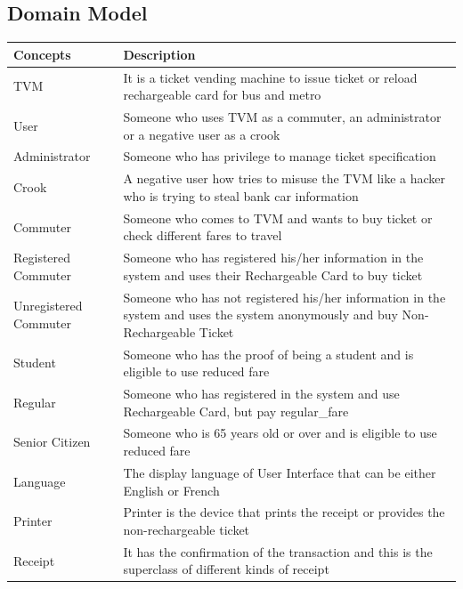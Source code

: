 \documentclass[a4paper,12pt]{report}
\begin{document}
\subsection{Domain Model}
\setlength{\tabcolsep}{18pt}
\renewcommand{\arraystretch}{1.5}
\begin{tabular}[H]{ |p{3cm}|p{12cm}| }
	\hline
	\textbf{Concepts}  & \textbf{Description}  \\
	\hline
	TVM & It is a ticket vending machine to issue ticket or reload rechargeable card for bus and metro
	\\
	\hline
	User & Someone who uses TVM as a commuter, an administrator or a negative user as a crook
	\\
	\hline
	Administrator & Someone who has privilege to manage ticket specification
	\\
	\hline
	Crook & A negative user how tries to misuse the TVM like a hacker who is trying to steal bank car information
	\\
	\hline
	Commuter & Someone who comes to TVM and wants to buy ticket or check different fares to travel
	\\
	\hline
	Registered Commuter & Someone who has registered his/her information in the system and uses their Rechargeable Card to buy ticket
	\\
	\hline
	Unregistered Commuter & Someone who has not registered his/her information in the system and uses the system anonymously and buy Non-Rechargeable Ticket
	\\
	\hline
	Student & Someone who has the proof of being a student and is eligible to use reduced fare
	\\
	\hline
	Regular & Someone who has registered in the system and use Rechargeable Card, but pay \gls{regular_fare}
	\\
	\hline
	Senior Citizen & Someone who is 65 years old or over and is eligible to use reduced fare
	\\
	\hline
	Language & The display language of User Interface that can be either English or French
	\\
	\hline
	Printer & Printer is the device that prints the receipt or provides the non-rechargeable ticket
	\\
	\hline 
	Receipt & It has the confirmation of the transaction and this is the superclass of different kinds of receipt
	\\
	\hline
\end{tabular}
	
\end{document}
